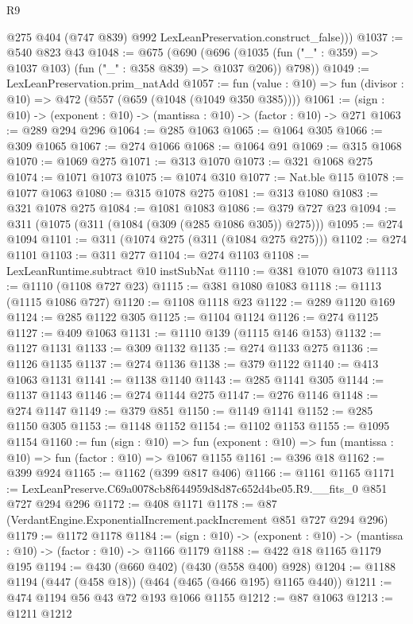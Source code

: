 \begin{lexlean}{R9}
\begin{coremodule}
          @275
          @404
          (@747 @839)
          @992
          LexLeanPreservation.construct_false)))
@1037 := @540 @823 @43
@1048 := @675
    (@690
      (@696 (@1035 (fun ("_" : @359) => @1037 @103) (fun ("_" : @358 @839) => @1037 @206)) @798))
@1049 := LexLeanPreservation.prim_natAdd
@1057 := fun (value : @10) => fun (divisor : @10) => @472 (@557 (@659 (@1048 (@1049 @350 @385))))
@1061 := (sign : @10) -> (exponent : @10) -> (mantissa : @10) -> (factor : @10) -> @271
@1063 := @289 @294 @296
@1064 := @285 @1063
@1065 := @1064 @305
@1066 := @309 @1065
@1067 := @274 @1066
@1068 := @1064 @91
@1069 := @315 @1068
@1070 := @1069 @275
@1071 := @313 @1070
@1073 := @321 @1068 @275
@1074 := @1071 @1073
@1075 := @1074 @310
@1077 := Nat.ble @115
@1078 := @1077 @1063
@1080 := @315 @1078 @275
@1081 := @313 @1080
@1083 := @321 @1078 @275
@1084 := @1081 @1083
@1086 := @379 @727 @23
@1094 := @311 (@1075 (@311 (@1084 (@309 (@285 @1086 @305)) @275)))
@1095 := @274 @1094
@1101 := @311 (@1074 @275 (@311 (@1084 @275 @275)))
@1102 := @274 @1101
@1103 := @311 @277
@1104 := @274 @1103
@1108 := LexLeanRuntime.subtract @10 instSubNat
@1110 := @381 @1070 @1073
@1113 := @1110 (@1108 @727 @23)
@1115 := @381 @1080 @1083
@1118 := @1113 (@1115 @1086 @727)
@1120 := @1108 @1118 @23
@1122 := @289 @1120 @169
@1124 := @285 @1122 @305
@1125 := @1104 @1124
@1126 := @274 @1125
@1127 := @409 @1063
@1131 := @1110 @139 (@1115 @146 @153)
@1132 := @1127 @1131
@1133 := @309 @1132
@1135 := @274 @1133 @275
@1136 := @1126 @1135
@1137 := @274 @1136
@1138 := @379 @1122
@1140 := @413 @1063 @1131
@1141 := @1138 @1140
@1143 := @285 @1141 @305
@1144 := @1137 @1143
@1146 := @274 @1144 @275
@1147 := @276 @1146
@1148 := @274 @1147
@1149 := @379 @851
@1150 := @1149 @1141
@1152 := @285 @1150 @305
@1153 := @1148 @1152
@1154 := @1102 @1153
@1155 := @1095 @1154
@1160 := fun (sign : @10) =>
  fun (exponent : @10) => fun (mantissa : @10) => fun (factor : @10) => @1067 @1155
@1161 := @396 @18
@1162 := @399 @924
@1165 := @1162 (@399 @817 @406)
@1166 := @1161 @1165
@1171 := LexLeanPreserve.C69a0078cb8f644959d8d87c652d4be05.R9.__fits_0 @851 @727 @294 @296
@1172 := @408 @1171
@1178 := @87 (VerdantEngine.ExponentialIncrement.packIncrement @851 @727 @294 @296)
@1179 := @1172 @1178
@1184 := (sign : @10) -> (exponent : @10) -> (mantissa : @10) -> (factor : @10) -> @1166 @1179
@1188 := @422 @18 @1165 @1179 @195
@1194 := @430 (@660 @402) (@430 (@558 @400) @928)
@1204 := @1188 @1194 (@447 (@458 @18)) (@464 (@465 (@466 @195) @1165 @440))
@1211 := @474 @1194 @56 @43 @72 @193 @1066 @1155
@1212 := @87 @1063
@1213 := @1211 @1212

\end{coremodule}
\end{lexlean}
